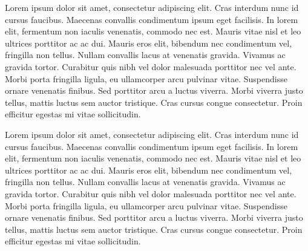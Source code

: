 
Lorem ipsum dolor sit amet, consectetur adipiscing elit. Cras interdum nunc id cursus faucibus. Maecenas convallis condimentum ipsum eget facilisis. In lorem elit, fermentum non iaculis venenatis, commodo nec est. Mauris vitae nisl et leo ultrices porttitor ac ac dui. Mauris eros elit, bibendum nec condimentum vel, fringilla non tellus. Nullam convallis lacus at venenatis gravida. Vivamus ac gravida tortor. Curabitur quis nibh vel dolor malesuada porttitor nec vel ante. Morbi porta fringilla ligula, eu ullamcorper arcu pulvinar vitae. Suspendisse ornare venenatis finibus. Sed porttitor arcu a luctus viverra. Morbi viverra justo tellus, mattis luctus sem auctor tristique. Cras cursus congue consectetur. Proin efficitur egestas mi vitae sollicitudin.

Lorem ipsum dolor sit amet, consectetur adipiscing elit. Cras interdum nunc id cursus faucibus. Maecenas convallis condimentum ipsum eget facilisis. In lorem elit, fermentum non iaculis venenatis, commodo nec est. Mauris vitae nisl et leo ultrices porttitor ac ac dui. Mauris eros elit, bibendum nec condimentum vel, fringilla non tellus. Nullam convallis lacus at venenatis gravida. Vivamus ac gravida tortor. Curabitur quis nibh vel dolor malesuada porttitor nec vel ante. Morbi porta fringilla ligula, eu ullamcorper arcu pulvinar vitae. Suspendisse ornare venenatis finibus. Sed porttitor arcu a luctus viverra. Morbi viverra justo tellus, mattis luctus sem auctor tristique. Cras cursus congue consectetur. Proin efficitur egestas mi vitae sollicitudin.

\clearpage